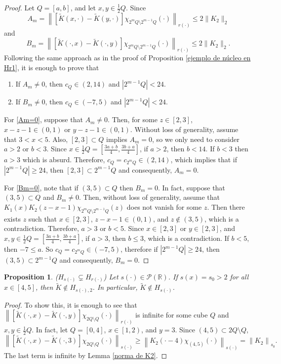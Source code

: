 \documentclass[a4paper,11pt,reqno]{amsart}
\theoremstyle{plain}
\numberwithin{equation}{section}
\newtheorem{propo}[teo]{Proposition}
\theoremstyle{definition}
\begin{document}
\begin{proof}
	 Let $Q=[a,b]$, and let $x,y\in\frac{1}{2}Q$. Since 
	 $$A_m=\left\|\left[\tilde{K}(x,\cdot)-\tilde{K}(y,\cdot)\right]\chi_{2^mQ\setminus2^{m-1}Q}(\cdot)\right\|_{r(\cdot)}\leq 2\|K_2\|_2$$
	 and
	 $$B_m=\left\|\left[\tilde{K}(\cdot, x)-\tilde{K}(\cdot,y)\right]\chi_{2^mQ\setminus2^{m-1}Q}(\cdot)\right\|_{r(\cdot)}\leq 2\|K_2\|_2.$$
	 Following the same approach as in the proof of Proposition \ref{ejemplo de núcleo en Hr1}, it is enough to prove that	 
	\begin{enumerate}
		\item\label{Am=0} If $A_m\neq0$, then $c_Q\in(2,14)$ and $|2^{m-1} Q|<24$.
		\item\label{Bm=0} If $B_m\neq0$, then $c_Q\in(-7,5)$ and $|2^{m-1}Q|<24$.
	\end{enumerate}
	For \eqref{Am=0}, suppose that $A_m\neq0$. Then, for some $z\in[2,3]$, $x-z-1 \in (0,1)$ or $y-z-1\in(0,1)$. Without loss of generality, assume that $3<x<5$. Also, $[2,3] \subset Q$ implies $A_m=0$, so we only need to consider $a>2$ or $b<3$. Since $x\in\frac{1}{2}Q=\left[\frac{3a+b}{4},\frac{3b+a}{4}\right]$, if $a>2$, then $b<14$. If $b<3$ then $a>3$ which is absurd. Therefore, $c_Q=c_{2^m Q}\in(2,14)$, which implies that if $|2^{m-1} Q|\geq24$, then $[2,3]\subset2^{m-1}Q$ and consequently, $A_m=0$.
	
	For \eqref{Bm=0}, note that if $(3,5)\subset Q$ then $B_m=0$. In fact, suppose that $(3,5)\subset Q$ and $B_m\neq0$. Then, without loss of generality, assume that $K_1(x)K_2(z-x-1)\chi_{2^mQ\setminus2^{m-1}Q}(z)$ does not vanish for some $z$. Then there exists $z$ such that $x\in [2,3]$, $z-x-1\in(0,1)$, and $z\notin(3,5)$, which is a contradiction. Therefore, $a>3$ or $b<5$. Since $x\in [2,3]$ or $y\in[2,3]$, and $x,y\in\frac{1}{2}Q=\left[\frac{3a+b}{4},\frac{3b+a}{4}\right]$, if $a>3$, then $b\leq3$, which is a contradiction. If $b<5$, then $-7\leq a$. So $c_Q=c_{2^mQ}\in(-7,5)$, therefore if $|2^{m-1}Q|\geq24$, then $(3,5)\subset2^{m-1}Q$ and consequently, $B_m=0$.
\end{proof}	 

\begin{propo}($H_{s(\cdot)}\varsubsetneq H_{r(\cdot)}$)
	Let ${s(\cdot)}\in\mathcal{P}(\mathbb{R})$. If $s(x)=s_0>2$ for all $x\in [4,5]$, then $\tilde{K}\notin H_{{s(\cdot)},2}$. In particular, $\tilde{K}\notin H_{s(\cdot)}$.
\end{propo}
\begin{proof}
	To show this, it is enough to see that $\left\| \left[\tilde{K}(\cdot,x) - \tilde{K}(\cdot,y)\right]\chi_{2Q\setminus Q}(\cdot)\right\|_{r(\cdot)}$ is infinite for some cube $Q$ and $x,y\in\frac{1}{2}Q$. In fact, let $Q=[0,4]$, $x\in\left[1,2\right)$, and $y=3$. Since $(4,5)\subset2Q\setminus Q$, 
	\begin{equation*}
		\left\| \left[\tilde{K}(\cdot,x) - \tilde{K}(\cdot,3)\right]\chi_{2Q\setminus Q}(\cdot)\right\|_{{s(\cdot)}}\geq\left\| K_2(\cdot-4)\chi_{(4,5)}(\cdot)\right\|_{s(\cdot)}=
		\left\| K_2\right\|_{s_0}.
	\end{equation*}
	The last term is infinite by Lemma \ref{norma de K2}.
\end{proof} 
\end{document}
